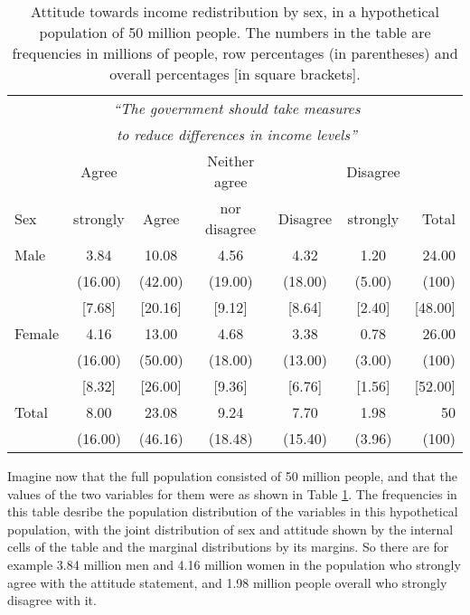 \begin{table}
\caption{Attitude towards income redistribution by sex, in a hypothetical
population of 50 million people. The numbers in the table are
frequencies in millions of people, row percentages (in parentheses) and
overall percentages [in square brackets].}
\label{t_sex_attitude_pop}
\begin{center}
\begin{tabular}{|l|ccccc|r|}\hline
& \multicolumn{5}{|c|}{\emph{``The government should
take measures}} & \\
& \multicolumn{5}{|c|}{\emph{to reduce differences in income levels''}}
& \\
 & Agree & & Neither agree & & Disagree & \\
Sex & strongly & Agree & nor disagree & Disagree & strongly & Total \\ \hline
Male & 3.84 & 10.08 & 4.56 & 4.32 & 1.20  &  24.00\\
& (16.00) & (42.00) &(19.00) & (18.00) & (5.00) & (100) \\
& [7.68] & [20.16] & [9.12] & [8.64] & [2.40] & [48.00] \\
Female & 4.16 & 13.00 & 4.68 & 3.38 & 0.78 & 26.00\\
& (16.00) & (50.00) & (18.00) & (13.00) & (3.00) & (100)\\
& [8.32] & [26.00] & [9.36] & [6.76] & [1.56] & [52.00] \\
\hline
Total & 8.00 & 23.08 &  9.24&  7.70& 1.98 & 50 \\
      & (16.00) & (46.16) & (18.48) & (15.40) & (3.96) & (100) \\
\hline
\end{tabular}
\end{center}

\end{table}

Imagine now that the full population consisted of 50 million people, and
that the values of the two variables for them were as shown in Table
\ref{t_sex_attitude_pop}. The frequencies in this table desribe the
population distribution of the variables in this hypothetical
population, with the joint distribution of sex and attitude shown by the
internal cells of the table and the marginal distributions by its
margins. So there are for example 3.84 million men and 4.16 million
women in the population who strongly agree with the attitude statement,
and 1.98 million people overall who strongly
disagree with it.

